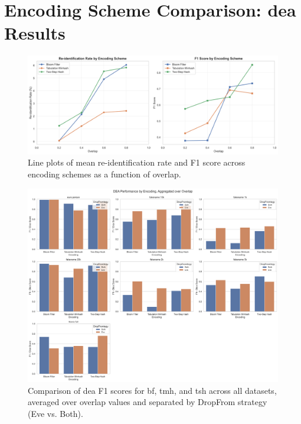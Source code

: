 \clearpage

\section{Encoding Scheme Comparison: \ac{dea} Results} \label{sec:encoding_comparison_results}

\begin{figure}[H]
    \centering
    \includegraphics[width=\textwidth]{figures/dea_encoding_comparison_line_charts.png}
    \caption{Line plots of mean re-identification rate and F1 score across encoding schemes as a function of overlap.}
    \label{fig:dea_encoding_comparison_lines}
\end{figure}

\begin{figure}[H]
    \centering
    \includegraphics[width=\textwidth]{figures/dea_encoding_comparison_all_datasets.png}
    \caption{Comparison of \ac{dea} F1 scores for \ac{bf}, \ac{tmh}, and \ac{tsh} across all datasets, averaged over overlap values and separated by DropFrom strategy (Eve vs. Both).}
    \label{fig:dea_encoding_comparison_bar}
\end{figure}





